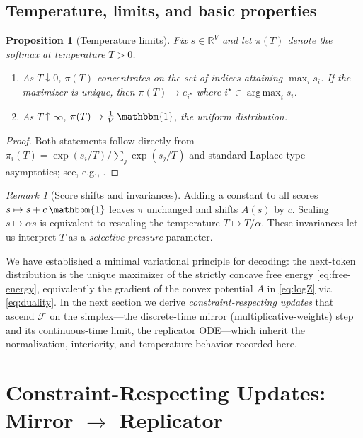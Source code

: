 \documentclass[11pt,reqno]{article}
\numberwithin{equation}{section}
\theoremstyle{plain}
\newtheorem{proposition}[theorem]{Proposition}
\theoremstyle{definition}
\theoremstyle{remark}
\newtheorem{remark}[theorem]{Remark}
\DeclareMathOperator*{\argmax}{arg\,max}
\newcommand{\R}{\mathbb{R}}
\newcommand{\1}{\mathbbm{1}}
\begin{document}
\subsection{Temperature, limits, and basic properties}
\begin{proposition}[Temperature limits]\label{prop:temperature-limits}
Fix $s\in\R^V$ and let $\pi(T)$ denote the softmax at temperature $T>0$.
\begin{enumerate}
\item As $T\downarrow 0$, $\pi(T)$ concentrates on the set of indices attaining $\max_i s_i$. If the maximizer is unique, then $\pi(T)\to e_{i^\star}$ where $i^\star\in\argmax_i s_i$.
\item As $T\uparrow \infty$, $\pi(T)\to \tfrac{1}{V}\,\1$, the uniform distribution.
\end{enumerate}
\end{proposition}

\begin{proof}
Both statements follow directly from $\pi_i(T)=\exp(s_i/T)/\sum_j\exp(s_j/T)$ and standard Laplace-type asymptotics; see, e.g., \citet[§12]{cover2006elements}.
\end{proof}

\begin{remark}[Score shifts and invariances]\label{rem:invariance}
Adding a constant to all scores $s\mapsto s+c\,\1$ leaves $\pi$ unchanged and shifts $A(s)$ by $c$. Scaling $s\mapsto \alpha s$ is equivalent to rescaling the temperature $T\mapsto T/\alpha$. These invariances let us interpret $T$ as a \emph{selective pressure} parameter.
\end{remark}


We have established a minimal variational principle for decoding: the next-token distribution is the unique maximizer of the strictly concave free energy \eqref{eq:free-energy}, equivalently the gradient of the convex potential $A$ in \eqref{eq:logZ} via \eqref{eq:duality}. In the next section we derive \emph{constraint-respecting updates} that ascend $\mathcal{F}$ on the simplex—the discrete-time mirror (multiplicative-weights) step and its continuous-time limit, the replicator ODE—which inherit the normalization, interiority, and temperature behavior recorded here.



\section{Constraint-Respecting Updates: Mirror $\rightarrow$ Replicator}\label{sec:mirror}
\end{document}
